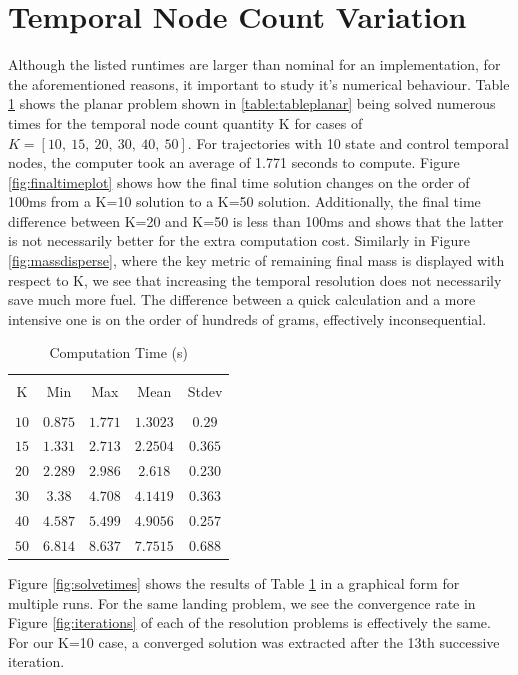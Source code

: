 \section{Temporal Node Count Variation}
Although the listed runtimes are larger than nominal for an implementation, for the aforementioned reasons, it important to study it's numerical behaviour. Table \ref{table:timingtable} shows the planar problem shown in \ref{table:tableplanar} being solved numerous times for the temporal node count quantity K for cases of $K = [10, \ 15, \ 20, \ 30, \ 40, \ 50]$. For trajectories with 10 state and control temporal nodes, the computer took an average of 1.771 seconds to compute. Figure \ref{fig:finaltimeplot} shows how the final time solution changes on the order of 100ms from a K=10 solution to a K=50 solution. Additionally, the final time difference between K=20 and K=50 is less than 100ms and shows that the latter is not necessarily better for the extra computation cost. Similarly in Figure \ref{fig:massdisperse}, where the key metric of remaining final mass is displayed with respect to K, we see that increasing the temporal resolution does not necessarily save much more fuel. The difference between a quick calculation and a more intensive one is on the order of hundreds of grams, effectively inconsequential.


\begin{table}[ht]
\caption{Computation Time (s)}
\centering 
\begin{tabular}{c c c c c} 
\hline\hline \\[0.5ex] 
K & Min & Max & Mean & Stdev \\ 
\hline \\
$10$    &$0.875 $   &$1.771 $  &$1.3023  $  &$0.29$  \\ 
$15$    &$1.331 $   &$2.713 $  &$2.2504  $  &$0.365$  \\ 
$20$    &$2.289$    &$2.986$   &$2.618  $   &$0.230$  \\ 
$30$    &$ 3.38 $   &$4.708 $  &$4.1419  $  &$0.363$  \\ 
$40$    &$4.587 $   &$5.499 $  &$4.9056  $  &$0.257$  \\ 
$50$    &$6.814 $   &$8.637 $  &$7.7515  $  &$0.688$  \\[1ex] 
\hline
\end{tabular}
\label{table:timingtable}
\end{table}

Figure \ref{fig:solvetimes} shows the results of Table \ref{table:timingtable} in a graphical form for multiple runs. For the same landing problem, we see the convergence rate in Figure \ref{fig:iterations} of each of the resolution problems is effectively the same. For our K=10 case, a converged solution was extracted after the 13th successive iteration.


